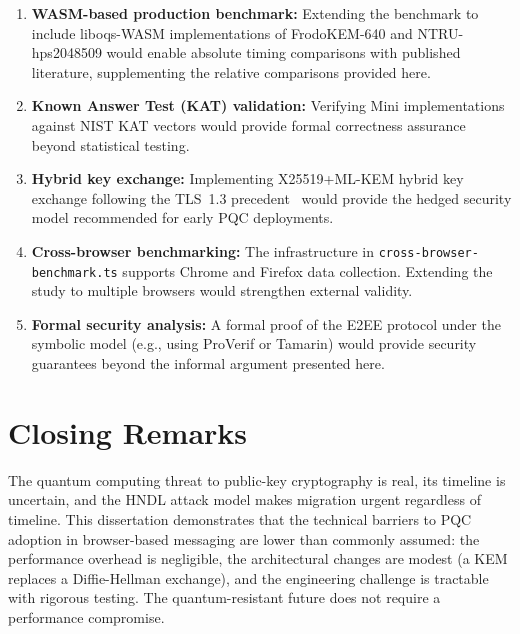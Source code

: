 \documentclass[12pt,a4paper]{report}
\begin{document}
\begin{enumerate}
  \item \textbf{WASM-based production benchmark:} Extending the benchmark to include
  liboqs-WASM implementations of FrodoKEM-640 and NTRU-hps2048509 would enable
  absolute timing comparisons with published literature, supplementing the relative
  comparisons provided here.

  \item \textbf{Known Answer Test (KAT) validation:} Verifying Mini implementations
  against NIST KAT vectors would provide formal correctness assurance beyond
  statistical testing.

  \item \textbf{Hybrid key exchange:} Implementing X25519+ML-KEM hybrid key exchange
  following the TLS~1.3 precedent~\cite{tls13} would provide the hedged security
  model recommended for early PQC deployments.

  \item \textbf{Cross-browser benchmarking:} The infrastructure in
  \texttt{cross-browser-benchmark.ts} supports Chrome and Firefox data collection.
  Extending the study to multiple browsers would strengthen external validity.

  \item \textbf{Formal security analysis:} A formal proof of the E2EE protocol under
  the symbolic model (e.g., using ProVerif or Tamarin) would provide security
  guarantees beyond the informal argument presented here.
\end{enumerate}

\section{Closing Remarks}

The quantum computing threat to public-key cryptography is real, its timeline is
uncertain, and the HNDL attack model makes migration urgent regardless of timeline.
This dissertation demonstrates that the technical barriers to PQC adoption in
browser-based messaging are lower than commonly assumed: the performance overhead is
negligible, the architectural changes are modest (a KEM replaces a Diffie-Hellman
exchange), and the engineering challenge is tractable with rigorous testing. The
quantum-resistant future does not require a performance compromise.
\end{document}
